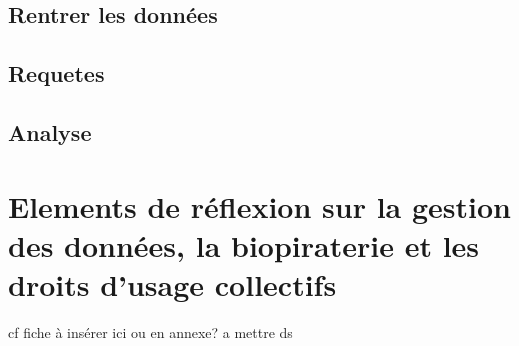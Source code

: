 \subsection{Rentrer les données}


\subsection{Requetes}


\subsection{Analyse}


\section{Elements de réflexion sur la gestion des données, la biopiraterie et les droits d'usage collectifs}

cf fiche à insérer ici ou en annexe? a mettre ds \formationH






